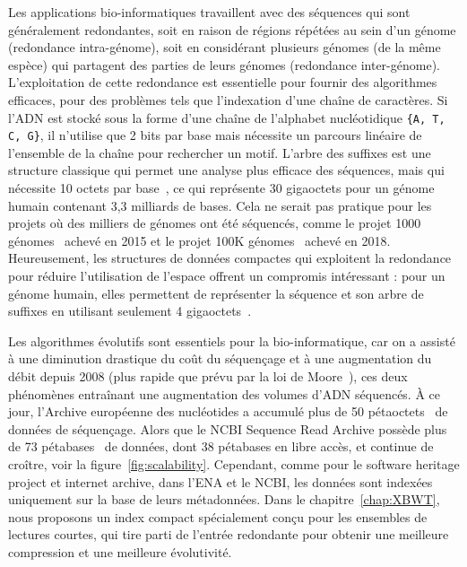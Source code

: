 Les applications bio-informatiques travaillent avec des séquences qui sont généralement redondantes, soit en raison de régions répétées au sein d'un génome (redondance intra-génome), soit en considérant plusieurs génomes (de la même espèce) qui partagent des parties de leurs génomes (redondance inter-génome).
L'exploitation de cette redondance est essentielle pour fournir des algorithmes efficaces, pour des problèmes tels que l'indexation d'une chaîne de caractères.
Si l'ADN est stocké sous la forme d'une chaîne de l'alphabet nucléotidique \texttt{\{A, T, C, G\}}, il n'utilise que 2 bits par base mais nécessite un parcours linéaire de l'ensemble de la chaîne pour rechercher un motif. 
L'arbre des suffixes est une structure classique qui permet une analyse plus efficace des séquences, mais qui nécessite 10 octets par base~\cite{navarro2016compact}, ce qui représente 30 gigaoctets pour un génome humain contenant 3,3 milliards de bases. 
Cela ne serait pas pratique pour les projets où des milliers de génomes ont été séquencés, comme le projet 1000 génomes~\cite{10002015global} achevé en 2015 et le projet 100K génomes~\cite{100Kgenomes} achevé en 2018. 
Heureusement, les structures de données compactes qui exploitent la redondance pour réduire l'utilisation de l'espace offrent un compromis intéressant : pour un génome humain, elles permettent de représenter la séquence et son arbre de suffixes en utilisant seulement 4 gigaoctets~\cite{navarro2016compact}.

Les algorithmes évolutifs sont essentiels pour la bio-informatique, car on a assisté à une diminution drastique du coût du séquençage et à une augmentation du débit depuis 2008 (plus rapide que prévu par la loi de Moore~\cite{muir2016real}), ces deux phénomènes entraînant une augmentation des volumes d'ADN séquencés. 
À ce jour, l'Archive européenne des nucléotides a accumulé plus de 50 pétaoctets~\cite{ena} de données de séquençage.
Alors que le NCBI Sequence Read Archive possède plus de 73 pétabases~\cite{sra} de données, dont 38 pétabases en libre accès, et continue de croître, voir la figure~\ref{fig:scalability}. Cependant, comme pour le software heritage project et internet archive, dans l'ENA et le NCBI, les données sont indexées uniquement sur la base de leurs métadonnées.
Dans le chapitre~\ref{chap:XBWT}, nous proposons un index compact spécialement conçu pour les ensembles de lectures courtes, qui tire parti de l'entrée redondante pour obtenir une meilleure compression et une meilleure évolutivité.

